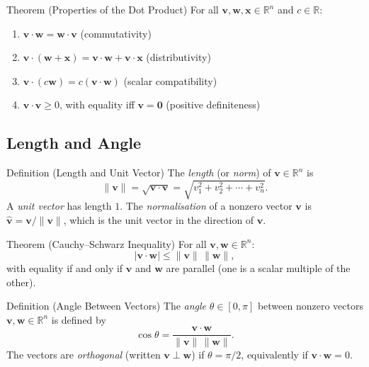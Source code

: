 \begin{theorembox}{Theorem (Properties of the Dot Product)}
For all $\mathbf{v}, \mathbf{w}, \mathbf{x} \in \mathbb{R}^n$ and $c \in \mathbb{R}$:
\begin{enumerate}
  \item $\mathbf{v} \cdot \mathbf{w} = \mathbf{w} \cdot \mathbf{v}$ \hfill (commutativity)
  \item $\mathbf{v} \cdot (\mathbf{w} + \mathbf{x}) = \mathbf{v} \cdot \mathbf{w} + \mathbf{v} \cdot \mathbf{x}$ \hfill (distributivity)
  \item $\mathbf{v} \cdot (c\mathbf{w}) = c(\mathbf{v} \cdot \mathbf{w})$ \hfill (scalar compatibility)
  \item $\mathbf{v} \cdot \mathbf{v} \geq 0$, with equality iff $\mathbf{v} = \mathbf{0}$ \hfill (positive definiteness)
\end{enumerate}
\end{theorembox}

\subsection*{Length and Angle}

\begin{propositionbox}{Definition (Length and Unit Vector)}
The \emph{length} (or \emph{norm}) of $\mathbf{v} \in \mathbb{R}^n$ is
\[
  \|\mathbf{v}\| = \sqrt{\mathbf{v} \cdot \mathbf{v}} = \sqrt{v_1^2 + v_2^2 + \cdots + v_n^2}.
\]
A \emph{unit vector} has length $1$.
The \emph{normalisation} of a nonzero vector $\mathbf{v}$ is
$\hat{\mathbf{v}} = \mathbf{v}/\|\mathbf{v}\|$, which is the unit vector in the direction of $\mathbf{v}$.
\end{propositionbox}

\begin{theorembox}{Theorem (Cauchy--Schwarz Inequality)}
For all $\mathbf{v}, \mathbf{w} \in \mathbb{R}^n$:
\[
  |\mathbf{v} \cdot \mathbf{w}| \leq \|\mathbf{v}\|\,\|\mathbf{w}\|,
\]
with equality if and only if $\mathbf{v}$ and $\mathbf{w}$ are parallel
(one is a scalar multiple of the other).
\end{theorembox}

\begin{propositionbox}{Definition (Angle Between Vectors)}
The \emph{angle} $\theta \in [0, \pi]$ between nonzero vectors $\mathbf{v}, \mathbf{w} \in \mathbb{R}^n$
is defined by
\[
  \cos\theta = \frac{\mathbf{v} \cdot \mathbf{w}}{\|\mathbf{v}\|\,\|\mathbf{w}\|}.
\]
The vectors are \emph{orthogonal} (written $\mathbf{v} \perp \mathbf{w}$) if $\theta = \pi/2$,
equivalently if $\mathbf{v} \cdot \mathbf{w} = 0$.
\end{propositionbox}

